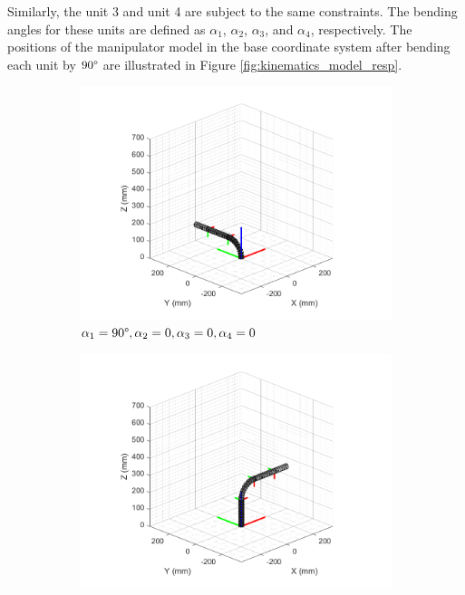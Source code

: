 Similarly, the unit 3 and unit 4 are subject to the same constraints. The bending angles for these units are defined as 
$\alpha_1$, $\alpha_2$, $\alpha_3$, and $\alpha_4$, respectively. The positions of the manipulator model in the base coordinate 
system after bending each unit by $90 \degree$ are illustrated in Figure \ref{fig:kinematics_model_resp}.
\begin{figure}[H] %
    \centering %
    \captionsetup{labelsep=colon}
    \begin{subfigure}{0.48\textwidth} %
        \centering
        \includegraphics[width=\linewidth]{Image/MATLAB/manipulator_90_0_0_0.png}
        \caption{$\alpha_1=90 \degree,\alpha_2=0,\alpha_3=0,\alpha_4=0$}
    \end{subfigure}
    \hfill
    \begin{subfigure}{0.48\textwidth} %
        \centering
        \includegraphics[width=\linewidth]{Image/MATLAB/manipulator_0_90_0_0.png}

\end{subfigure}
\end{figure}
